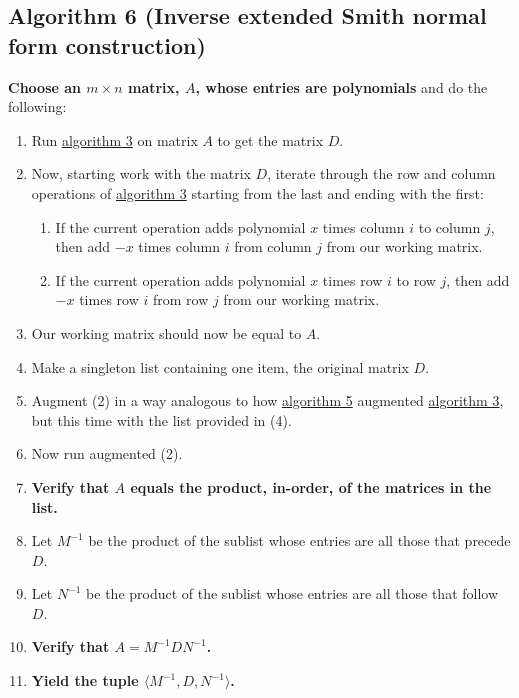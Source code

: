 \documentclass[twocolumn]{article}
\begin{document}
		\subsection{Algorithm 6 (Inverse extended Smith normal form construction)}\label{sec:algorithm 6}
			\textbf{Choose an $m\times n$ matrix, $A$, whose entries are polynomials} and do the following:
			\begin{enumerate}
				\item Run \hyperref[sec:algorithm 3]{algorithm 3} on matrix $A$ to get the matrix $D$.
				\item Now, starting work with the matrix $D$, iterate through the row and column operations of \hyperref[sec:algorithm 3]{algorithm 3} starting from the last and ending with the first:
					\begin{enumerate}
						\item If the current operation adds polynomial $x$ times column $i$ to column $j$, then add $-x$ times column $i$ from column $j$ from our working matrix.
						\item If the current operation adds polynomial $x$ times row $i$ to row $j$, then add $-x$ times row $i$ from row $j$ from our working matrix.
					\end{enumerate}
				\item Our working matrix should now be equal to $A$.
				\item Make a singleton list containing one item, the original matrix $D$.
				\item Augment (2) in a way analogous to how \hyperref[sec:algorithm 5]{algorithm 5} augmented \hyperref[sec:algorithm 3]{algorithm 3}, but this time with the list provided in (4).
				\item Now run augmented (2).
				\item \textbf{Verify that $A$ equals the product, in-order, of the matrices in the list.}
				\item Let $M^{-1}$ be the product of the sublist whose entries are all those that precede $D$.
				\item Let $N^{-1}$ be the product of the sublist whose entries are all those that follow $D$.
				\item \textbf{Verify that $A=M^{-1}DN^{-1}$.}
				\item \textbf{Yield the tuple $\langle M^{-1}, D, N^{-1}\rangle$.}
			\end{enumerate}
\end{document}
